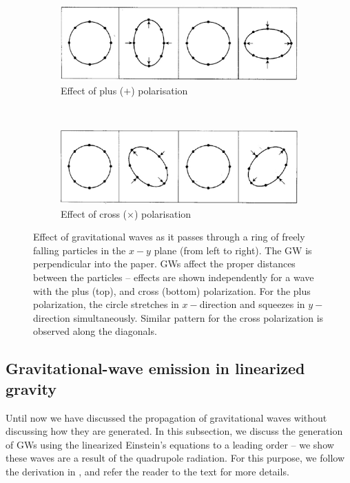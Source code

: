 \begin{figure}
\centering
\begin{subfigure}{\textwidth}
  \centering
  \includegraphics[width=0.5\linewidth]{figures/Introduction/pluspol.eps}
  \caption{Effect of plus ($+$) polarisation}
  \label{fig:sub1}
\end{subfigure}\\
\begin{subfigure}{\textwidth}
  \centering
  \includegraphics[width=0.5\linewidth]{figures/Introduction/crosspol.eps}
  \caption{Effect of cross ($\times$) polarisation}
  \label{fig:sub2}
\end{subfigure}
\caption{Effect of gravitational waves as it passes through a ring of freely falling particles in the $x-y$ plane (from left to right). The GW is perpendicular into the paper. GWs affect the proper distances between the particles -- effects are shown independently for a wave with the plus (top), and cross (bottom) polarization. For the plus polarization, the circle stretches in $x-$direction and squeezes in $y-$direction simultaneously. Similar pattern for the cross polarization is observed along the diagonals.}
\label{fig:Polarisation}
\end{figure}



\subsection{Gravitational-wave emission in linearized gravity}
Until now we have discussed the propagation of gravitational waves without discussing how they are generated. In this subsection, we discuss the generation of GWs using the linearized Einstein's equations to a leading order -- we show these waves are a result of the quadrupole radiation. For this purpose, we follow the derivation in \cite{Maggiore:2008aaa}, and refer the reader to the text for more details. 

